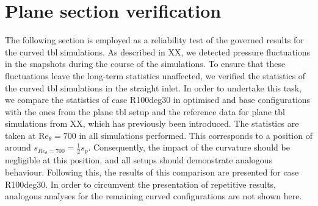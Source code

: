 \section{Plane section verification}
The following section is employed as a reliability test of the governed results for the curved \acrshort{tbl} simulations.
As described in XX, we detected pressure fluctuations in the snapshots during the course of the simulations.
To ensure that these fluctuations leave the long-term statistics unaffected, we verified the statistics of the curved \acrshort{tbl} simulations in the straight inlet.
In order to undertake this task,  we compare the statistics of case R100deg30 in optimised and base configurations with the ones from the plane \acrfull{tbl} setup and the reference data for plane \acrshort{tbl} simulations from XX, which has previously been introduced.
The statistics are taken at $\mathrm{Re}_{\theta} = 700$ in all simulations performed. This corresponds to a position of around $s_{Re_{\theta}= 700} = \frac{1}{2} s_p$.
Consequently,  the impact of the curvature should be negligible at this position, and all setups should  demonstrate analogous behaviour.
Following this, the results of this comparison are presented for case R100deg30. 
In order to circumvent the presentation of repetitive results, analogous analyses for the remaining curved configurations are not shown here.
